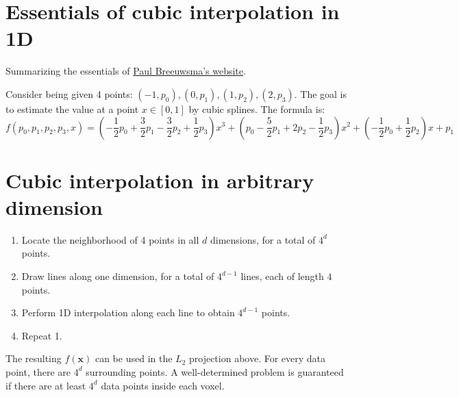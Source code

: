 \documentclass[11pt]{article}
\begin{document}
\section{Essentials of cubic interpolation in 1D}


Summarizing the essentials of \href{https://www.paulinternet.nl/?page=bicubic}{Paul Breeuwsma's website}.

Consider being given 4 points: $(-1,p_0),(0,p_1),(1,p_2),(2,p_3)$. The goal is to estimate the value at a point $x \in [0,1]$ by cubic splines. The formula is:
\begin{equation}
f(p_0,p_1,p_2,p_3,x) = \left ( - \frac{1}{2} p_0 + \frac{3}{2} p_1 - \frac{3}{2} p_2 + \frac{1}{2} p_3 \right ) x^3 + \left ( p_0 - \frac{5}{2} p_1 + 2 p_2 - \frac{1}{2} p_3 \right ) x^2 + \left ( - \frac{1}{2} p_0 + \frac{1}{2} p_2 \right ) x + p_1
\end{equation}


\section{Cubic interpolation in arbitrary dimension}


\begin{enumerate}
\item Locate the neighborhood of 4 points in all $d$ dimensions, for a total of $4^d$ points.
\item Draw lines along one dimension, for a total of $4^{d-1}$ lines, each of length $4$ points.
\item Perform 1D interpolation along each line to obtain $4^{d-1}$ points.
\item Repeat 1.
\end{enumerate}

The resulting $f(\boldsymbol{x})$ can be used in the $L_2$ projection above. For every data point, there are $4^d$ surrounding points. A well-determined problem is guaranteed if there are at least $4^d$ data points inside each voxel.
\end{document}
